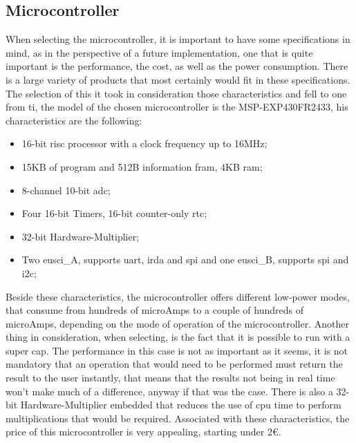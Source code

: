 \subsection{Microcontroller}
When selecting the microcontroller, it is important to have some specifications in mind, as in the perspective of a future implementation, one that is quite important is the performance, the cost, as well as the power consumption. There is a large variety of products that most certainly would fit in these specifications. The selection of this it took in consideration those characteristics and fell to one from \acrlong{ti}, the model of the chosen microcontroller is the MSP-EXP430FR2433, his characteristics are the following:
\begin{itemize}
    \item 16-bit \acrshort{risc} processor with a clock frequency up to 16MHz;
    \item 15KB of program and 512B information \acrshort{fram}, 4KB \acrshort{ram};
    \item 8-channel 10-bit \acrshort{adc};
    \item Four 16-bit Timers, 16-bit counter-only \acrshort{rtc};
    \item 32-bit Hardware-Multiplier;
    \item Two \acrshort{eusci}\_A, supports \acrshort{uart}, \acrshort{irda} and \acrshort{spi} and one \acrshort{eusci}\_B, supports \acrshort{spi} and \acrshort{i2c};
\end{itemize}
Beside these characteristics, the microcontroller offers different low-power modes, that consume from hundreds of microAmps to a couple of hundreds of microAmps, depending on the mode of operation of the microcontroller. Another thing in consideration, when selecting, is the fact that it is possible to run with a super cap. The performance in this case is not as important as it seems, it is not mandatory that an operation that would need to be performed must return the result to the user instantly, that means that the results not being in real time won't make much of a difference, anyway if that was the case. There is also a 32-bit Hardware-Multiplier embedded that reduces the use of \acrshort{cpu} time to perform multiplications that would be required\cite{MSP430FR2433DataSheet}. Associated with these characteristics, the price of this microcontroller is very appealing, starting under 2€.

